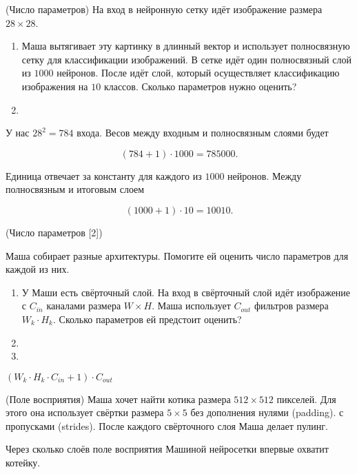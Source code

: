 \begin{problem}{(Число параметров)}
На вход в нейронную сетку идёт изображение размера $28 \times 28$.

\begin{enumerate}
\item Маша вытягивает эту картинку в длинный вектор и использует полносвязную сетку для классификации изображений. В сетке идёт один полносвязный слой из $1000$ нейронов. После идёт слой, который осуществляет классификацию изображения на $10$ классов. Сколько параметров нужно оценить?

\item {}

\end{enumerate}
\end{problem}
\begin{sol}
У нас $28^2 = 784$ входа. Весов между входным и полносвязным слоями будет 

\[ (784 + 1)\cdot 1000 = 785000.\] 

Единица отвечает за константу для каждого из $1000$ нейронов. Между полносвязным и итоговым слоем

\[(1000 + 1) \cdot 10 = 10010. \]
\end{sol} 

\begin{problem}{(Число параметров [2])}

Маша собирает разные архитектуры. Помогите ей оценить число параметров для каждой из них. 

\begin{enumerate} 
    \item У Маши есть свёрточный слой. На вход в свёрточный слой идёт изображение с $C_{in}$ каналами размера $W \times H$. Маша использует $C_{out}$ фильтров размера $W_k \cdot H_k$. Сколько параметров ей предстоит оценить?
    
    \item 
    
    \item  {}
    
\end{enumerate} 
\end{problem}
\begin{sol}
$(W_k \cdot H_k \cdot C_{in} + 1) \cdot C_{out}$
\end{sol} 

\begin{problem}{(Поле восприятия)}
    Маша хочет найти котика размера $512 \times 512$ пикселей. Для этого она использует свёртки размера $5 \times 5$ без дополнения нулями (padding).  с пропусками (strides). После каждого свёрточного слоя Маша делает пулинг. 
    
    Через сколько слоёв поле восприятия Машиной нейросетки впервые охватит котейку. 
\end{problem}



